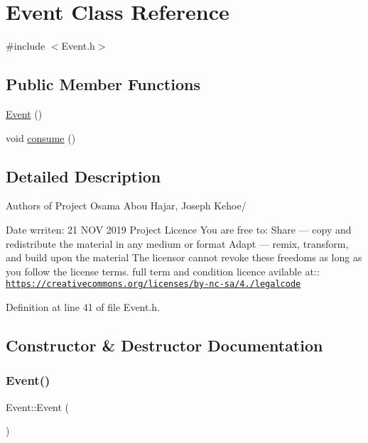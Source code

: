 \hypertarget{class_event}{}\section{Event Class Reference}
\label{class_event}


{\ttfamily \#include $<$Event.\+h$>$}

\subsection*{Public Member Functions}
\begin{DoxyCompactItemize}
\item 
\hyperlink{class_event_a5a40dd4708297f7031e29b39e039ae10}{Event} ()
\item 
void \hyperlink{class_event_ab57583f1d8975c19bd1c6448482d958d}{consume} ()
\end{DoxyCompactItemize}


\subsection{Detailed Description}
Authors of Project Osama Abou Hajar, Joseph Kehoe/

Date wrriten\+: 21 N\+OV 2019 Project Licence You are free to\+: Share — copy and redistribute the material in any medium or format Adapt — remix, transform, and build upon the material The licensor cannot revoke these freedoms as long as you follow the license terms. full term and condition licence avilable at\+:\+: \href{https://creativecommons.org/licenses/by-nc-sa/4.0/legalcode}{\tt https\+://creativecommons.\+org/licenses/by-\/nc-\/sa/4./legalcode} 

Definition at line 41 of file Event.\+h.



\subsection{Constructor \& Destructor Documentation}
\mbox{\label{class_event_a5a40dd4708297f7031e29b39e039ae10}} 
\subsubsection{\texorpdfstring{Event()}{Event()}}
{\footnotesize\ttfamily Event\+::\+Event (\begin{DoxyParamCaption}{ }\end{DoxyParamCaption})}



